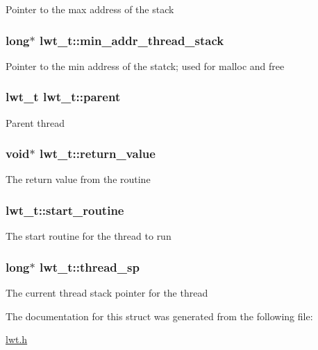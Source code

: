 Pointer to the max address of the stack \hypertarget{structlwt_a62ea9a882e0a197b9b076e1e018048d7}{
\subsubsection[{min\+\_\+addr\+\_\+thread\+\_\+stack}]{\setlength{\rightskip}{0pt plus 5cm}long$\ast$ lwt\+\_\+t\+::min\+\_\+addr\+\_\+thread\+\_\+stack}}\label{structlwt_a62ea9a882e0a197b9b076e1e018048d7}
Pointer to the min address of the statck; used for malloc and free \hypertarget{structlwt_a1849cde569fc8f254db05365de570b0e}{
\subsubsection[{parent}]{\setlength{\rightskip}{0pt plus 5cm}lwt\+\_\+t lwt\+\_\+t\+::parent}}\label{structlwt_a1849cde569fc8f254db05365de570b0e}
Parent thread \hypertarget{structlwt_a22ac5beef8503481294035218e73c3ef}{
\subsubsection[{return\+\_\+value}]{\setlength{\rightskip}{0pt plus 5cm}void$\ast$ lwt\+\_\+t\+::return\+\_\+value}}\label{structlwt_a22ac5beef8503481294035218e73c3ef}
The return value from the routine \hypertarget{structlwt_acdcfc344e943154b9d3d11e1a41cb9f1}{
\subsubsection[{start\+\_\+routine}]{ lwt\+\_\+t\+::start\+\_\+routine}}\label{structlwt_acdcfc344e943154b9d3d11e1a41cb9f1}
The start routine for the thread to run \hypertarget{structlwt_aba48cdf2f962d7ededf74923ddd33ea1}{
\subsubsection[{thread\+\_\+sp}]{\setlength{\rightskip}{0pt plus 5cm}long$\ast$ lwt\+\_\+t\+::thread\+\_\+sp}}\label{structlwt_aba48cdf2f962d7ededf74923ddd33ea1}
The current thread stack pointer for the thread 

The documentation for this struct was generated from the following file\+:\begin{DoxyCompactItemize}
\item 
\hyperlink{lwt_8h}{lwt.\+h}\end{DoxyCompactItemize}
